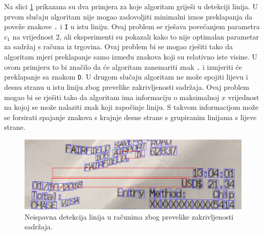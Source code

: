 \documentclass[times, utf8, zavrsni]{fer}
\begin{document}
Na slici \ref{fig:error-01} prikazana su dva primjera za koje algoritam griješi
u detekciji linija. U prvom slučaju algoritam nije mogao zadovoljiti minimalni iznos preklapanja da poveže znakove \lstinline{.} i \lstinline{I} u istu liniju. Ovaj problem se rješava povećanjem parametra $c_1$ na vrijednost $2$, ali eksperimenti su pokazali kako to nije optimalan parametar za sadržaj s računa iz trgovina. Ovaj problem bi se mogao rješiti tako da algoritam mjeri preklapanje samo između znakova koji su relativno iste visine. U ovom primjeru to bi značilo da će algoritam zanemariti znak \lstinline{.} i izmjeriti će preklapanje sa znakom \lstinline{D}. U drugom slučaju algoritam ne može spojiti lijevu i desnu stranu u istu liniju zbog prevelike zakrivljenosti sadržaja. Ovaj problem mogao bi se rješiti tako da algoritam ima informaciju o maksimalnoj $x$ vrijednost na kojoj se može nalaziti znak koji započinje liniju. S takvom informacijom može se forsirati spajanje znakova s krajnje desne strane s grupiranim linijama s lijeve strane.

\begin{figure}[htb]
    \centering
    \captionsetup{justification=centering,margin=2cm}
    \includegraphics[width=\textwidth]{images/error-01.png}
    \caption{
        Neispavna detekcija linija u računima zbog prevelike zakrivljenosti sadržaja.
    }
    \label{fig:error-01}
\end{figure}
\end{document}
